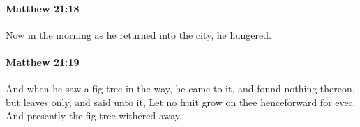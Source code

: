 		\paragraph{Matthew 21:18} %
			\label{MATTHEW-21-18}

			Now in the morning as he returned into the city, he hungered.

			\begin{framed}
			\scriptsize
				\begin{compactdesc}
					\item[SBLG] 
				\end{compactdesc}
			\end{framed}

		\paragraph{Matthew 21:19} %
			\label{MATTHEW-21-19}

			And when he saw a fig tree in the way, he came to it, and found nothing thereon, but leaves only, and said unto it, Let no fruit grow on thee henceforward for ever. And presently the fig tree withered away.


